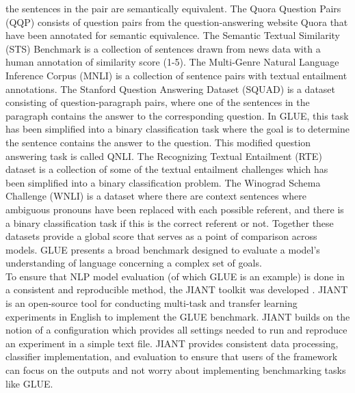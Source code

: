 the sentences in the pair are semantically equivalent. The Quora Question Pairs (QQP) \cite{QQP} consists of question pairs from the question-answering website Quora that have been annotated for semantic equivalence. The Semantic Textual Similarity (STS) Benchmark \cite{Cer2017SemEval2017T1} is a collection of sentences drawn from news data with a human annotation of similarity score (1-5). The Multi-Genre Natural Language Inference Corpus (MNLI) \cite{Williams2018ABC} is a collection of sentence pairs with textual entailment annotations. The Stanford Question Answering Dataset (SQUAD) \cite{Rajpurkar2016SQuAD10} is a dataset consisting of question-paragraph pairs, where one of the sentences in the paragraph contains the answer to the corresponding question. In GLUE, this task has been simplified into a binary classification task where the goal is to determine the sentence contains the answer to the question. This modified question answering task is called QNLI. The Recognizing Textual Entailment (RTE) dataset is a collection of some of the textual entailment challenges \cite{Dagan2005ThePR} \cite{BarHaim2006TheSP} \cite{Giampiccolo2007TheTP}\cite{Bentivogli2009TheSP} which has been simplified into a binary classification problem. The Winograd Schema Challenge (WNLI) \cite{Levesque2011TheWS} is a dataset where there are context sentences where ambiguous pronouns have been replaced with each possible referent, and there is a binary classification task if this is the correct referent or not. Together these datasets provide a global score that serves as a point of comparison across models. GLUE presents a broad benchmark designed to evaluate a model's understanding of language concerning a complex set of goals. \\ 
To ensure that NLP model evaluation (of which GLUE is an example) is done in a consistent and reproducible method, the JIANT toolkit was developed \cite{Pruksachatkun2020jiantAS}. JIANT is an open-source tool for conducting multi-task and transfer learning experiments in English to implement the GLUE benchmark. JIANT builds on the notion of a configuration which provides all settings needed to run and reproduce an experiment in a simple text file. JIANT provides consistent data processing, classifier implementation, and evaluation to ensure that users of the framework can focus on the outputs and not worry about implementing benchmarking tasks like GLUE.